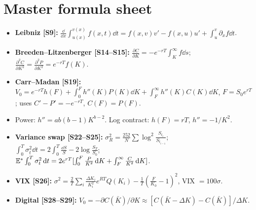 \documentclass[10pt]{article}
\begin{document}
\section{Master formula sheet}
\begin{itemize}
\item \textbf{Leibniz [S9]:} $\frac{\dd}{\dd x}\int_{u(x)}^{v(x)}f(x,t)\dd t=f(x,v)v'-f(x,u)u'+\int_u^v\partial_xf\dd t$.
\item \textbf{Breeden--Litzenberger [S14--S15]:} $\frac{\partial C}{\partial K}=-e^{-rT}\int_K^\infty f\dd s$; $\frac{\partial^2C}{\partial K^2}=\frac{\partial^2P}{\partial K^2}=e^{-rT}f(K)$.
\item \textbf{Carr--Madan [S19]:} $V_0=e^{-rT}h(F)+\int_0^Fh''(K)P(K)\dd K+\int_F^\infty h''(K)C(K)\dd K$, $F=S_0e^{rT}$; uses $C'-P'=-e^{-rT}$, $C(F)=P(F)$.
\item Power: $h''=ab(b-1)K^{b-2}$. Log contract: $h(F)=rT$, $h''=-1/K^2$.
\item \textbf{Variance swap [S22--S25]:} $\sigma_R^2=\frac{252}{N}\sum\log^2\frac{S_{t_i}}{S_{t_{i-1}}}$; $\int_0^T\sigma_t^2\dd t=2\int_0^T\frac{\dd S}{S}-2\log\frac{S_T}{S_0}$;\\ $\mathbb{E}^*\int_0^T\sigma_t^2\,\mathrm{d} t=2e^{rT}[\int_0^F\frac{P}{K^2}\,\mathrm{d} K+\int_F^\infty\frac{C}{K^2}\,\mathrm{d} K]$.
\item \textbf{VIX [S26]:} $\sigma^2=\frac2T\sum_i\frac{\Delta K_i}{K_i^2}e^{RT}Q(K_i)-\frac1T(\frac{F}{K_0}-1)^2$, VIX $=100\sigma$.
\item \textbf{Digital [S28--S29]:} $V_0=-\partial C(\bar K)/\partial K\approx[C(\bar K-\Delta K)-C(\bar K)]/\Delta K$.
\end{itemize}
\end{document}
